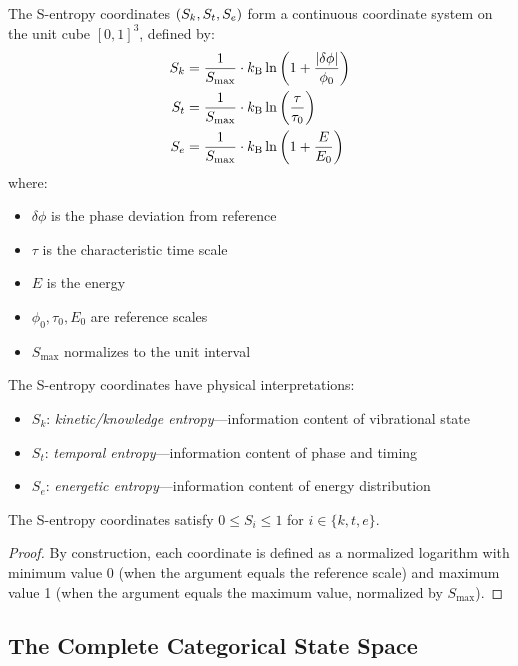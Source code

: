 \begin{definition}
\label{def:s_entropy}
The S-entropy coordinates $(S_k,S_t,S_e)$ form a continuous coordinate system on the unit cube $[0,1]^3$, defined by:
\begin{align}
S_k &= \frac{1}{S_{\max}} \cdot k_{\mathrm{B}} \ln\left(1 + \frac{|\delta\phi|}{\phi_0}\right) \label{eq:Sk}\\
S_t &= \frac{1}{S_{\max}} \cdot k_{\mathrm{B}} \ln\left(\frac{\tau}{\tau_0}\right) \label{eq:St}\\
S_e &= \frac{1}{S_{\max}} \cdot k_{\mathrm{B}} \ln\left(1 + \frac{E}{E_0}\right) \label{eq:Se}
\end{align}
where:
\begin{itemize}
    \item $\delta\phi$ is the phase deviation from reference
    \item $\tau$ is the characteristic time scale
    \item $E$ is the energy
    \item $\phi_0, \tau_0, E_0$ are reference scales
    \item $S_{\max}$ normalizes to the unit interval
\end{itemize}
\end{definition}

The S-entropy coordinates have physical interpretations:
\begin{itemize}
    \item $S_k$: \textit{kinetic/knowledge entropy}---information content of vibrational state
    \item $S_t$: \textit{temporal entropy}---information content of phase and timing
    \item $S_e$: \textit{energetic entropy}---information content of energy distribution
\end{itemize}

\begin{proposition}
The S-entropy coordinates satisfy $0 \leq S_i \leq 1$ for $i \in \{k, t, e\}$.
\end{proposition}

\begin{proof}
By construction, each coordinate is defined as a normalized logarithm with minimum value 0 (when the argument equals the reference scale) and maximum value 1 (when the argument equals the maximum value, normalized by $S_{\max}$).
\end{proof}

\subsection{The Complete Categorical State Space}

